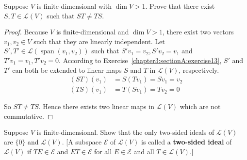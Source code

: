 \begin{exercise}
    Suppose $V$ is finite-dimensional with $\dim V > 1$. Prove that there exist $S, T \in \mathcal{L}(V)$ such that $ST \ne TS$.
\end{exercise}

\begin{proof}
    Because $V$ is finite-dimensional and $\dim V > 1$, there exist two vectors $v_{1}, v_{2}\in V$ such that they are linearly independent. Let $S', T'\in\mathcal{L}(\operatorname{span}(v_{1}, v_{2}))$ such that $S'v_{1} = v_{2}, S'v_{2} = v_{1}$ and $T'v_{1} = v_{1}, T'v_{2} = 0$. According to Exercise~\ref{chapter3:sectionA:exercise13}, $S'$ and $T'$ can both be extended to linear maps $S$ and $T$ in $\mathcal{L}(V)$, respectively.
    \begin{align*}
        (ST)(v_{1}) & = S(Tv_{1}) = Sv_{1} = v_{2} \\
        (TS)(v_{1}) & = T(Sv_{1}) = Tv_{2} = 0
    \end{align*}

    So $ST\ne TS$. Hence there exists two linear maps in $\mathcal{L}(V)$ which are not commutative.
\end{proof}
\newpage

\begin{exercise}\label{chapter3:sectionA:exercise17}
    Suppose $V$ is finite-dimensional. Show that the only two-sided ideals of $\mathcal{L}(V)$ are $\{0\}$ and $\mathcal{L}(V)$.
        [A subspace $\mathcal{E}$ of $\mathcal{L}(V)$ is called a \textbf{two-sided ideal} of $\mathcal{L}(V)$ if $TE \in \mathcal{E}$ and $ET \in \mathcal{E}$ for all $E \in \mathcal{E}$ and all $T \in \mathcal{L}(V)$.]
\end{exercise}

